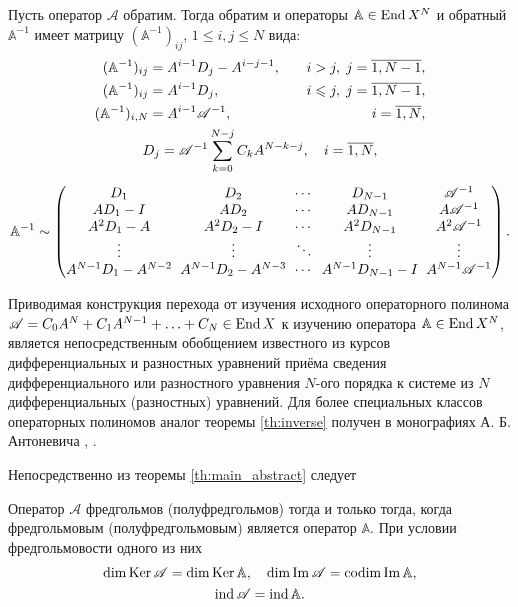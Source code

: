 \begin{theorem}\label{th:inverse}
    Пусть оператор $\mathcal A$ обратим. Тогда обратим и операторы $\mathbb A \in \operatorname{End} X^N$ и обратный $\mathbb A^{-1}$ имеет матрицу $(\mathbb A^{-1})_{ij}$, $1 \leq i, j \leq N$ вида:
    \begin{gather*}
        \begin{aligned}
        (\mathbb A^{-1})_{ij} &= A^{i-1} D_j - A^{i-j-1}, &\quad i > j, \; j = \overline{1,N-1}, \\
        (\mathbb A^{-1})_{ij} &= A^{i-1} D_j, &\quad i \leq j, \; j = \overline{1,N-1}, \\
        (\mathbb A^{-1})_{i,N} &= A^{i-1} \mathcal A^{-1}, &\quad i = \overline{1,N},
        \end{aligned}\\
        D_j = \mathcal A^{-1} \sum_{k = 0}^{N-j} C_k A^{N-k-j}, \quad i = \overline{1,N},\\[0.5em]
        \mathbb A^{-1} \sim
        \begingroup
        \renewcommand*{\arraycolsep}{3pt}
        \begin{pmatrix}
          D_1 &  D_2 &  \cdots & D_{N-1} &  \mathcal A^{-1} \\
          A D_1 - I & A D_2 & \cdots & A D_{N-1} & A  \mathcal A^{-1} \\
          A^2 D_1 - A & A^2 D_2 - I & \cdots & A^2 D_{N-1} & A^2 \mathcal A^{-1} \\
          \vdots & \vdots & \ddots & \vdots & \vdots \\
          A^{N-1} D_1 - A^{N-2} & A^{N-1} D_2 - A^{N-3} & \cdots & A^{N-1} D_{N-1} - I & A^{N-1}  \mathcal A^{-1}
       \end{pmatrix}
       \endgroup.
    \end{gather*}
\end{theorem}

Приводимая конструкция перехода от изучения исходного операторного полинома $\mathcal A = C_0 A^N + C_1 A^{N - 1} + \dotsc + C_N \in \operatorname{End} X$ к изучению оператора $\mathbb A \in \operatorname{End} X^N$, является непосредственным обобщением известного из курсов дифференциальных и разностных уравнений приёма сведения дифференциального или разностного уравнения $N$-ого порядка к системе из $N$ дифференциальных (разностных) уравнений. Для более специальных классов операторных полиномов аналог теоремы \ref{th:inverse} получен в монографиях А. Б. Антоневича \cite[теорема 9.1]{antonevich2}, \cite{antonevich}.

Непосредственно из теоремы \ref{th:main_abstract} следует
\begin{theorem}\label{th:abstract_fredholm}
    Оператор $\mathcal A$ фредгольмов (полуфредгольмов) тогда и только тогда, когда фредгольмовым (полуфредгольмовым) является оператор $\mathbb A$. При условии фредгольмовости одного из них
    \begin{gather*}
    \dim \operatorname{Ker} \mathcal A = \dim \operatorname{Ker} \mathbb A, \quad \dim \operatorname{Im} \mathcal A = \operatorname{codim} \operatorname{Im} \mathbb A, \\
    \operatorname{ind} \mathcal A = \operatorname{ind} \mathbb A.
    \end{gather*}
\end{theorem}

